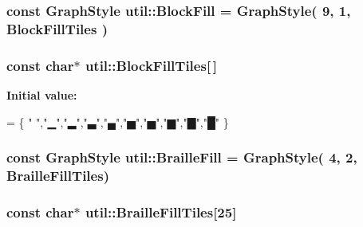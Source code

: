 \hypertarget{namespaceutil_a45e2bfe1f081d82eb1c8b85d1fdf52a5}{
\subsubsection[{Block\-Fill}]{\setlength{\rightskip}{0pt plus 5cm}const {\bf Graph\-Style} util\-::\-Block\-Fill = {\bf Graph\-Style}( 9, 1, {\bf Block\-Fill\-Tiles} )}}\label{namespaceutil_a45e2bfe1f081d82eb1c8b85d1fdf52a5}
\hypertarget{namespaceutil_a52616f9bfe6a1b55be4fbf59c86a395d}{
\subsubsection[{Block\-Fill\-Tiles}]{\setlength{\rightskip}{0pt plus 5cm}const char$\ast$ util\-::\-Block\-Fill\-Tiles\mbox{[}$\,$\mbox{]}}}\label{namespaceutil_a52616f9bfe6a1b55be4fbf59c86a395d}
{\bfseries Initial value\-:}
\begin{DoxyCode}
= \{
\textcolor{stringliteral}{" "},\textcolor{stringliteral}{"▁"},\textcolor{stringliteral}{"▂"},\textcolor{stringliteral}{"▃"},\textcolor{stringliteral}{"▄"},\textcolor{stringliteral}{"▅"},\textcolor{stringliteral}{"▅"},\textcolor{stringliteral}{"▆"},\textcolor{stringliteral}{"▇"},\textcolor{stringliteral}{"█"}
\}
\end{DoxyCode}
\hypertarget{namespaceutil_a0e903f9947d8a325181915b32e977e4c}{
\subsubsection[{Braille\-Fill}]{\setlength{\rightskip}{0pt plus 5cm}const {\bf Graph\-Style} util\-::\-Braille\-Fill = {\bf Graph\-Style}( 4, 2, {\bf Braille\-Fill\-Tiles})}}\label{namespaceutil_a0e903f9947d8a325181915b32e977e4c}
\hypertarget{namespaceutil_a8ad9251402b8a8b1b274962be11450cb}{
\subsubsection[{Braille\-Fill\-Tiles}]{\setlength{\rightskip}{0pt plus 5cm}const char$\ast$ util\-::\-Braille\-Fill\-Tiles\mbox{[}25\mbox{]}}}\label{namespaceutil_a8ad9251402b8a8b1b274962be11450cb}
